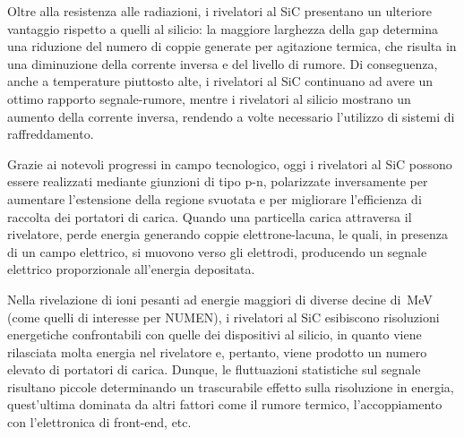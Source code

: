 Oltre alla resistenza alle radiazioni, i rivelatori al SiC presentano un ulteriore vantaggio rispetto a quelli al silicio: la maggiore larghezza della gap determina una riduzione del numero di coppie generate per agitazione termica, che risulta in una diminuzione della corrente inversa e del livello di rumore.
Di conseguenza, anche a temperature piuttosto alte, i rivelatori al SiC continuano ad avere un ottimo rapporto segnale-rumore, mentre i rivelatori al silicio mostrano un aumento della corrente inversa, rendendo a volte necessario l'utilizzo di sistemi di raffreddamento.

Grazie ai notevoli progressi in campo tecnologico, oggi i rivelatori al SiC possono essere realizzati mediante giunzioni di tipo p-n, polarizzate inversamente per aumentare l'estensione della regione svuotata e per migliorare l'efficienza di raccolta dei portatori di carica.
Quando una particella carica attraversa il rivelatore, perde energia generando coppie elettrone-lacuna, le quali, in presenza di un campo elettrico, si muovono verso gli elettrodi, producendo un segnale elettrico proporzionale all'energia depositata.

Nella rivelazione di ioni pesanti ad energie maggiori di diverse decine di~MeV (come quelli di interesse per NUMEN), i rivelatori al SiC esibiscono risoluzioni energetiche confrontabili con quelle dei dispositivi al silicio, in quanto viene rilasciata molta energia nel rivelatore e, pertanto, viene prodotto un numero elevato di portatori di carica.
Dunque, le fluttuazioni statistiche sul segnale risultano piccole determinando un trascurabile effetto sulla risoluzione in energia, quest'ultima dominata da altri fattori come il rumore termico, l'accoppiamento con l'elettronica di front-end, etc.

